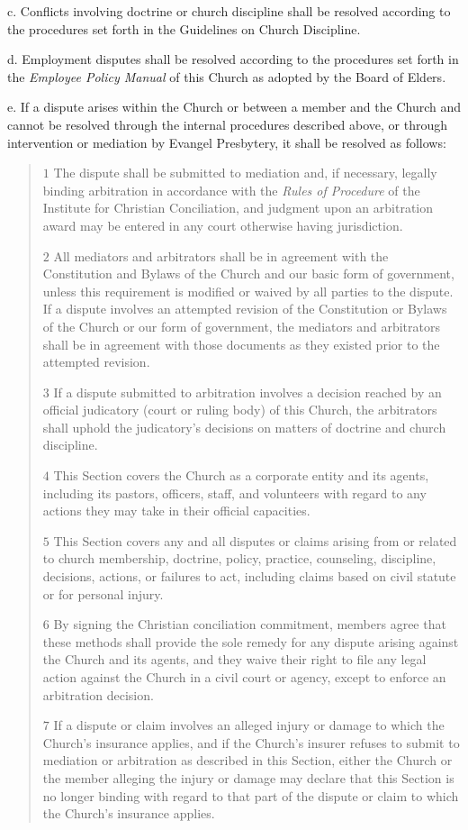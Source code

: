 \documentclass[
]{book}
\begin{document}
c. Conflicts involving doctrine or church discipline shall be resolved according to the procedures set forth in the Guidelines on Church Discipline.

d. Employment disputes shall be resolved according to the procedures set forth in the \emph{Employee Policy Manual} of this Church as adopted by the Board of Elders.

e. If a dispute arises within the Church or between a member and the Church and cannot be resolved through the internal procedures described above, or through intervention or mediation by Evangel Presbytery, it shall be resolved as follows:

\begin{quote}
\(1\) The dispute shall be submitted to mediation and, if necessary, legally binding arbitration in accordance with the \emph{Rules of Procedure} of the Institute for Christian Conciliation, and judgment upon an arbi­tra­tion award may be entered in any court otherwise having jurisdiction.

\(2\) All mediators and arbitrators shall be in agreement with the Constitution and Bylaws of the Church and our basic form of government, unless this requirement is modified or waived by all parties to the dispute. If a dispute involves an attempted revision of the Constitution or Bylaws of the Church or our form of government, the mediators and arbitrators shall be in agreement with those documents as they existed prior to the attempted revision.

\(3\) If a dispute submitted to arbitration involves a decision reached by an official judicatory (court or ruling body) of this Church, the arbitrators shall uphold the judicatory's decisions on matters of doctrine and church discipline.

\(4\) This Section covers the Church as a corporate entity and its agents, including its pastors, officers, staff, and volunteers with regard to any actions they may take in their official capacities.

\(5\) This Section covers any and all disputes or claims arising from or related to church membership, doctrine, policy, practice, counseling, discipline, decisions, actions, or failures to act, including claims based on civil statute or for personal injury.

\(6\) By signing the Christian conciliation commitment, members agree that these methods shall provide the sole remedy for any dispute arising against the Church and its agents, and they waive their right to file any legal action against the Church in a civil court or agency, except to enforce an arbitration decision.

\(7\) If a dispute or claim involves an alleged injury or damage to which the Church's insurance applies, and if the Church's insurer refuses to submit to mediation or arbitration as described in this Section, either the Church or the member alleging the injury or damage may declare that this Section is no longer binding with regard to that part of the dispute or claim to which the Church's insurance applies.
\end{quote}
\end{document}
